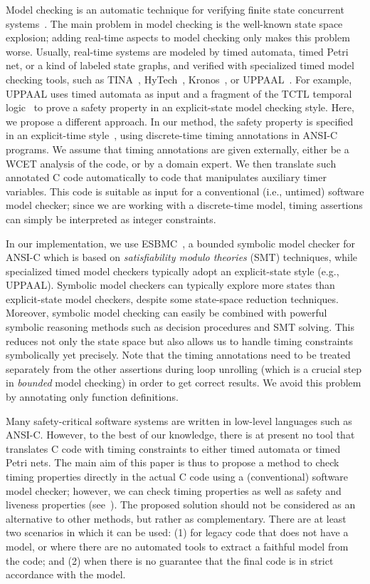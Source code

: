 \documentclass{llncs}
\begin{document}
Model checking is an automatic technique for verifying finite state concurrent systems~\cite{clarke00}. 
The main problem in model checking is the well-known state space explosion;
adding real-time aspects to model checking only makes this problem worse.
Usually, real-time systems are modeled by timed automata, timed Petri net, or a kind of labeled state graphs,
and verified with specialized timed model checking tools, 
such as TINA~\cite{Tina06}, HyTech~\cite{HyTech97}, Kronos~\cite{kronos97}, or UPPAAL~\cite{upaal97}.
For example, UPPAAL uses timed automata as input and
a fragment of the TCTL temporal logic~\cite{Wang06}
to prove a safety property 
in an explicit-state model checking style. 
Here, we propose a different approach.
In our method, the safety property is specified in an explicit-time style~\cite{Lamport05}, using discrete-time timing annotations 
in ANSI-C programs. 
We assume that timing annotations are given externally, either be 
a WCET analysis of the code, or by a domain expert.
We then translate such annotated C code automatically
to code that manipulates auxiliary timer variables. This code is suitable as 
input for a conventional (i.e., untimed) software model checker; since we are 
working with a discrete-time model, timing assertions can simply be interpreted
as integer constraints.

In our implementation, we use ESBMC~\cite{cordeiro11}, a bounded symbolic
model checker for ANSI-C which is based on \emph{satisfiability modulo
theories} (SMT) techniques, while specialized timed model checkers typically
adopt an explicit-state style (e.g., UPPAAL). 
Symbolic model checkers 
can typically explore more states than explicit-state model checkers,
despite some state-space reduction techniques.
Moreover, symbolic model checking can easily be combined with powerful
symbolic reasoning methods such as decision procedures and SMT solving. 
This reduces not only the state space but also allows us to handle timing
constraints symbolically yet precisely. 
Note that the timing annotations need to be treated separately from the other
assertions during loop unrolling (which is a crucial step in \emph{bounded}
model checking) in order to get correct results. We avoid this
problem by annotating only function definitions.

Many safety-critical software systems are written in low-level languages such as
ANSI-C. However, to the best of our knowledge, there is at present no
tool that translates C code with timing constraints to either timed automata or
timed Petri nets.
The main aim of this paper is thus to propose a method to check timing properties directly in the actual C code 
using a (conventional) software model checker;
however, we can check timing properties as well as safety and liveness properties (see~\cite{cordeiro11}).
The proposed solution should not be considered as an alternative to other methods, but rather as complementary. 
There are at least two scenarios in which it can be used: 
(1) for legacy code that does not have a model, or where there 
are no automated tools to extract a faithful model from the code; and 
(2) when there is no guarantee that the final code is in strict accordance with the model. 
\end{document}
